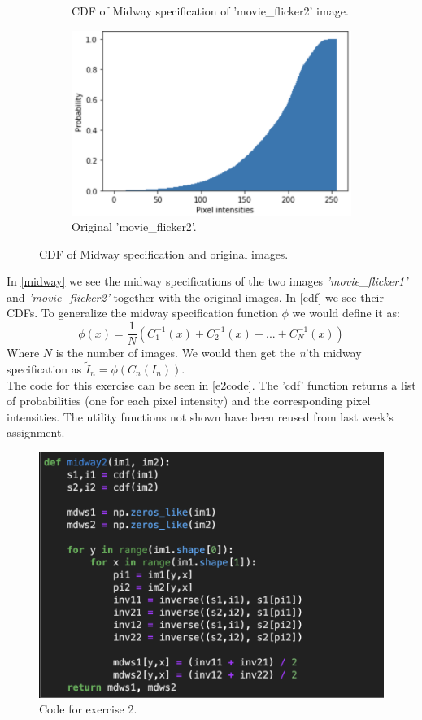 \begin{figure}[H]
\begin{subfigure}[b]{0.45\textwidth}
		\caption{CDF of Midway specification of 'movie\_flicker2' image.}
	\end{subfigure}
	\hfill
	\begin{subfigure}[b]{0.45\textwidth}
		\centering
		\includegraphics[width=\textwidth]{Materials/cdfmf2}
		\caption{Original 'movie\_flicker2'.\\\hfill}
	\end{subfigure}
	\caption{CDF of Midway specification and original images.}
	\label{cdf}
\end{figure}
In \autoref{midway} we see the midway specifications of the two images \textit{'movie\_flicker1'} and \textit{'movie\_flicker2'} together with the original images. In \autoref{cdf} we see their CDFs. To generalize the midway specification function $\phi$ we would define it as:
\begin{equation*}
	\phi(x) = \frac{1}{N}\left(C_1^{-1}(x)+C_2^{-1}(x)+...+C_N^{-1}(x)\right)
\end{equation*}
Where $N$ is the number of images. We would then get the \textit{n}'th midway specification as $\tilde{I}_n = \phi(C_n(I_n))$.\\
The code for this exercise can be seen in \autoref{e2code}. The 'cdf' function returns a list of probabilities (one for each pixel intensity) and the corresponding pixel intensities. The utility functions not shown have been reused from last week's assignment.
\begin{figure}[H]
	\centering
	\includegraphics[width=0.7\linewidth]{Materials/e2code}
	\caption{Code for exercise 2.}
	\label{e2code}
\end{figure}